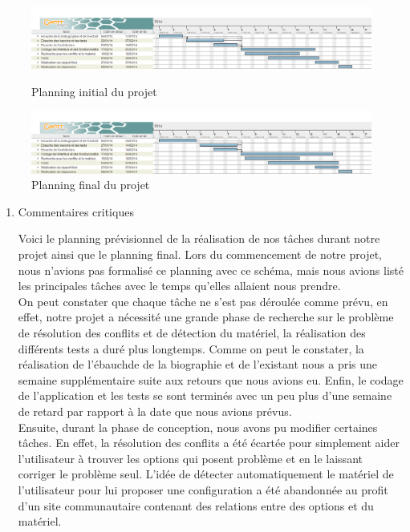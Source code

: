 \documentclass[16pts]{report}
\begin{document}
	\begin{figure}
		\includegraphics[scale=0.5]{./illustrations/planning_initial_pdp.png}
		\centering
		\caption{Planning initial du projet}
		\label{fig:PlanningInitial}
		\vspace{10.00mm}
		\includegraphics[scale=0.5]{./illustrations/planning_final_pdp.png}
		\centering
		\caption{Planning final du projet}
		\label{fig:PlanningFinal}
	\end{figure}
	
\newpage
\begin{enumerate}
	\item Commentaires critiques

	Voici le planning prévisionnel de la réalisation de nos tâches durant 
	notre projet ainsi que le planning final. Lors du commencement de notre 
	projet, nous n'avions pas formalisé ce planning avec ce schéma, mais nous 
	avions listé les principales tâches avec le temps qu'elles allaient 
	nous prendre.
	\\
	
	On peut constater que chaque tâche ne s'est pas déroulée comme prévu, 
	en effet, notre projet a nécessité une grande phase de recherche sur le 
	problème de résolution des conflits et de détection du matériel, la 
	réalisation des différents tests a duré plus longtemps. 
  Comme on peut le constater, la réalisation de l'ébauchde de la biographie 
  et de l'existant nous a pris une semaine supplémentaire suite aux retours 
  que nous avions eu. Enfin, le codage de l'application et les tests se sont 
  terminés avec un peu plus d'une semaine de retard par rapport à la date que 
  nous avions prévus.
	\\
	
	Ensuite, durant la phase de conception, nous avons pu modifier 
	certaines tâches. En effet, la résolution des conflits a été écartée pour 
  simplement aider l'utilisateur à trouver les options qui posent	problème 
  et en le laissant corriger le problème seul. L'idée de détecter 
	automatiquement le matériel de l'utilisateur pour lui proposer une 
	configuration a été abandonnée au profit d'un site communautaire 
	contenant des relations entre des options et du matériel.



\end{enumerate}
\end{document}
